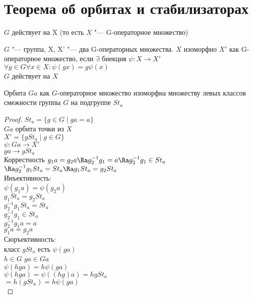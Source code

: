 ﻿\section{Теорема об орбитах и стабилизаторах}
$G$ действует на X (то есть $X$ "--- G-операторное множество)\\
\begin{Def}
$G$ "--- группа, X, X' "--- два G-операторных множества. 
$X$ изоморфно $X'$ как G-операторное множество, если 
$\exists$ биекция $\psi \colon X \to X'$\\
$\forall g \in G \forall x \in X \colon \psi(gx) = g \psi(x)$\\
$G$ действует на $X$\\
\end{Def}
\begin{theorem}
Орбита $Ga$ как $G$-операторное множество изоморфна
множеству левых классов смежности группы $G$ на подгруппе $St_a$
\end{theorem}
\begin{proof}
$St_a = \{g \in G \mid ga = a\}$\\
$Ga$ орбита точки из $X$\\
$X' = \{gSt_a \mid g \in G\}$\\
$\psi \colon Ga \to X'$\\
$ga \to g St_a$\\

Коррестность $g_1a  = g_2 a \Ra g_2^{-1}g_1 = a \Ra g_2^{-1}g_1 \in St_a$\\
$\Ra g_2^{-1}g_1 St_a = St_a \Ra g_1 St_a = g_2 St_a$\\

Инъективность:\\
$\psi (g_1 a) = \psi (g_2a)$\\
$g_1St_a = g_2St_a$\\
$g_2^{-1}g_1St_a = St_a$\\
$g_2^{-1}g_1 \in St_a$\\
$g_2^{-1}g_1a = a$\\
$g_1a = g_2a$\\

Сюръективность:\\
класс $gSt_a$ есть $\psi(ga)$\\
$h \in G$ $ga \in Ga$\\
$\psi(hga) = h \psi(ga)$\\
$\psi(hga) = \psi((hg)a) = hgSt_a$\\
$ = h(gSt_a) = h \psi(ga)$\\
\end{proof}
